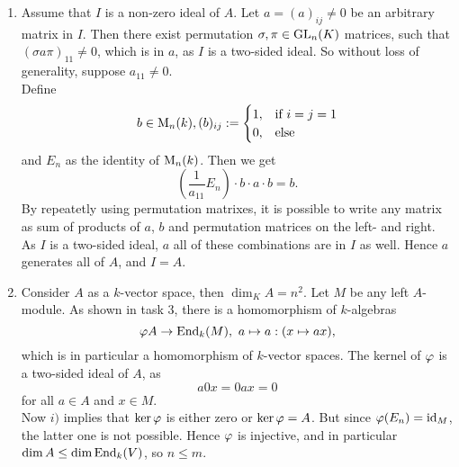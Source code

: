 \begin{sol}
  \begin{enumerate}
    \item Assume that $I$ is a non-zero ideal of $A$. Let $a=(a)_{ij}\neq 0$ be an arbitrary matrix in $I$. Then there exist permutation $\sigma, \pi \in \operatorname{GL}_n(K)$ matrices, such that $(\sigma a \pi)_{11}\neq 0$, which is in $a$, as $I$ is a two-sided ideal. So without loss of generality, suppose $a_{11}\neq 0$.\\
    Define
    \[
    b\in \operatorname{M}_n(k),(b)_{ij}:= \begin{cases} 1,&\text{if }i=j=1\\0,&\text{else}\\\end{cases}
    \]
    and $E_n$ as the identity of $\operatorname{M}_n(k)$. Then we get
    \[
    \left(\frac{1}{a_{11}} E_n\right)\cdot b \cdot a\cdot b = b.\]
    By repeatetly using permutation matrixes, it is possible to write any matrix as sum of products of $a$, $b$ and permutation matrices on the left- and right. As $I$ is a two-sided ideal, $a$ all of these combinations are in $I$ as well. Hence $a$ generates all of $A$, and $I=A$.
    \item Consider $A$ as a $k$-vector space, then $\dim_KA=n^2$. Let $M$ be any left $A$-module. As shown in task 3, there is a homomorphism of $k$-algebras
    \[
    \varphi A\to \operatorname{End}_k(M),~a\mapsto a:(x\mapsto ax),
    \]
    which is in particular a homomorphism of $k$-vector spaces. The kernel of $\varphi$ is a two-sided ideal of $A$, as
    \[
    a0x=0ax=0\]
    for all $a\in A$ and $x\in M$.\\
    Now $i)$ implies that $\ker \varphi$ is either zero or $\ker \varphi = A$. But since $\varphi(E_n)=\operatorname{id}_{M}$, the latter one is not possible. Hence $\varphi$ is injective, and in particular $\dim A\leq \dim \operatorname{End}_k(V)$, so $n\leq m$.
  \end{enumerate}
\end{sol}

